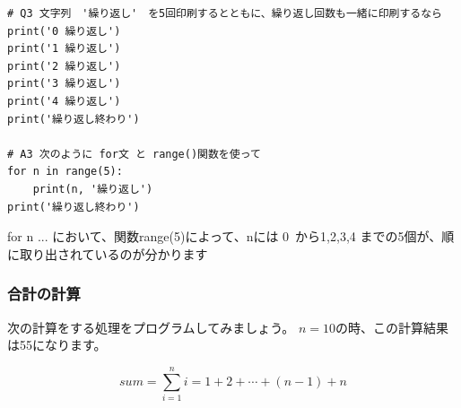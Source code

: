 \documentclass[uplatex,a4paper,11pt,oneside,openany]{jsbook}
\begin{document}
\begin{lstlisting}
# Q3 文字列　'繰り返し'　を5回印刷するとともに、繰り返し回数も一緒に印刷するなら
print('0 繰り返し')
print('1 繰り返し')
print('2 繰り返し')
print('3 繰り返し')
print('4 繰り返し')
print('繰り返し終わり')

# A3 次のように for文 と range()関数を使って
for n in range(5):
    print(n, '繰り返し')
print('繰り返し終わり')
\end{lstlisting}

for n ... において、関数range(5)によって、nには 0 から1,2,3,4 までの5個が、順に取り出されているのが分かります



\subsubsection{合計の計算}

次の計算をする処理をプログラムしてみましょう。
$n=10$の時、この計算結果は55になります。

\[
sum = \sum_{i=1}^{n}i = 1 + 2 + \cdots + (n-1) + n
\]
\end{document}
